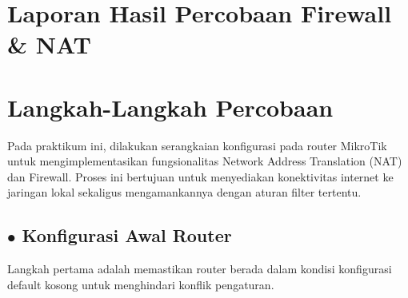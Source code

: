 \section*{Laporan Hasil Percobaan Firewall \& NAT}

\section{Langkah-Langkah Percobaan}
Pada praktikum ini, dilakukan serangkaian konfigurasi pada router MikroTik untuk mengimplementasikan fungsionalitas Network Address Translation (NAT) dan Firewall. Proses ini bertujuan untuk menyediakan konektivitas internet ke jaringan lokal sekaligus mengamankannya dengan aturan filter tertentu.

\subsection*{$\bullet$ Konfigurasi Awal Router}
Langkah pertama adalah memastikan router berada dalam kondisi konfigurasi default kosong untuk menghindari konflik pengaturan.

